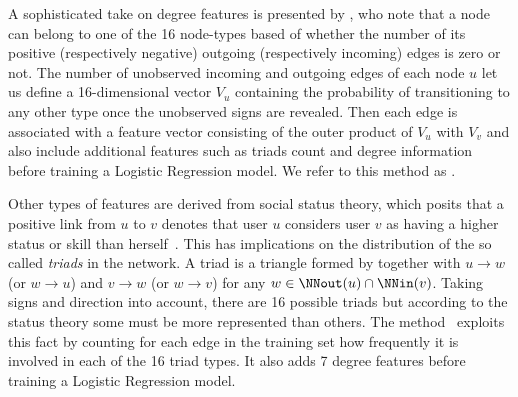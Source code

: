 A sophisticated take on degree features is presented by \textcite{Bayesian15}, who note that a node
can belong to one of the 16 node-types based of whether the number of its positive (respectively
negative) outgoing (respectively incoming) edges is zero or not. The number of unobserved incoming
and outgoing edges of each node $u$ let us define a 16-dimensional vector $V_u$ containing the
probability of transitioning to any other type once the unobserved signs are revealed. Then each
edge \euv is associated with a feature vector consisting of the outer
product of $V_u$ with $V_v$ and also include additional features such as triads count and degree
information before training a Logistic Regression model. We refer to this method as
\emph{\compbayesian{}}.

Other types of features are derived from social status theory, which posits that a positive link
from $u$ to $v$ denotes that user $u$ considers user $v$ as having a higher status or skill than
herself~\autocite{Leskovec2010}. This has implications on the distribution of the so called
\emph{triads} in the network. A triad is a triangle formed by \euv{} together with $u \rightarrow w$
(or $w \rightarrow u$) and $v \rightarrow w$ (or $w \rightarrow v$) for any $w \in \NNout(u) \cap
\NNin(v)$. Taking signs and direction into account, there are 16 possible triads but according to
the status theory some must be more represented than others. The \emph{\comptriads{}}
method~\autocite{Leskovec2010} exploits this fact by counting for each edge in the training set how
frequently it is involved in each of the 16 triad types. It also adds 7 degree features before
training a Logistic Regression model.

